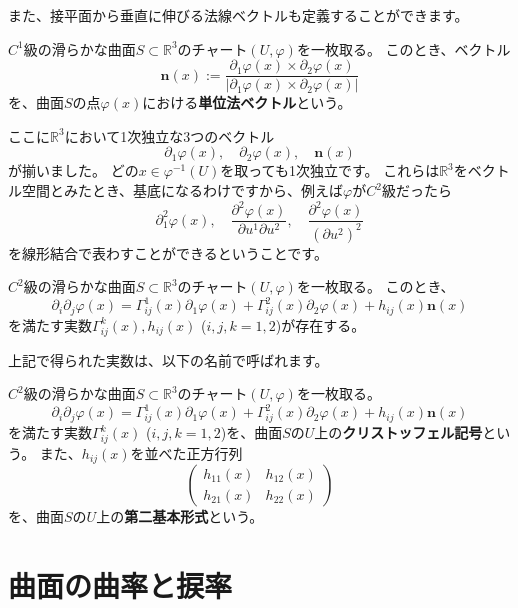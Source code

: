 また、接平面から垂直に伸びる法線ベクトルも定義することができます。
\begin{definition}[単位法ベクトル]
  $C^1$級の滑らかな曲面$S\subset\mathbb{R}^3$のチャート$(U,\varphi)$を一枚取る。
  このとき、ベクトル
  \[
    \mathbf{n}(x):=\frac{\partial_1\varphi(x)\times\partial_2\varphi(x)}{|\partial_1\varphi(x)\times\partial_2\varphi(x)|}
  \]
  を、曲面$S$の点$\varphi(x)$における\textbf{単位法ベクトル}という。
\end{definition}

ここに$\mathbb{R}^3$において1次独立な3つのベクトル
\[
  \partial_1\varphi(x),\quad\partial_2\varphi(x),\quad\mathbf{n}(x)
\]
が揃いました。
どの$x\in\varphi^{-1}(U)$を取っても1次独立です。
これらは$\mathbb{R}^3$をベクトル空間とみたとき、基底になるわけですから、例えば$\varphi$が$C^2$級だったら
\[
  \partial_1^2\varphi(x),\quad\frac{\partial^2\varphi(x)}{\partial u^1\partial u^2},\quad\frac{\partial^2\varphi(x)}{(\partial u^2)^2}
\]
を線形結合で表わすことができるということです。

\begin{theorem}[ガウスの公式]
  $C^2$級の滑らかな曲面$S\subset\mathbb{R}^3$のチャート$(U,\varphi)$を一枚取る。
  このとき、
  \[
    \partial_i\partial_j\varphi(x)=\Gamma_{ij}^1(x)\partial_1\varphi(x)+\Gamma_{ij}^2(x)\partial_2\varphi(x)+h_{ij}(x)\mathbf{n}(x)
  \]
  を満たす実数$\Gamma_{ij}^k(x),h_{ij}(x)$ ($i,j,k=1,2$)が存在する。
\end{theorem}

上記で得られた実数は、以下の名前で呼ばれます。
\begin{definition}[クリストッフェル記号と第二基本形式]
  $C^2$級の滑らかな曲面$S\subset\mathbb{R}^3$のチャート$(U,\varphi)$を一枚取る。
  \[
    \partial_i\partial_j\varphi(x)=\Gamma_{ij}^1(x)\partial_1\varphi(x)+\Gamma_{ij}^2(x)\partial_2\varphi(x)+h_{ij}(x)\mathbf{n}(x)
  \]
  を満たす実数$\Gamma_{ij}^k(x)$ ($i,j,k=1,2$)を、曲面$S$の$U$上の\textbf{クリストッフェル記号}という。
  また、$h_{ij}(x)$を並べた正方行列
  \[
    \begin{pmatrix}
      h_{11}(x) & h_{12}(x) \\
      h_{21}(x) & h_{22}(x)
    \end{pmatrix}
  \]
  を、曲面$S$の$U$上の\textbf{第二基本形式}という。
\end{definition}



\section{曲面の曲率と捩率}

